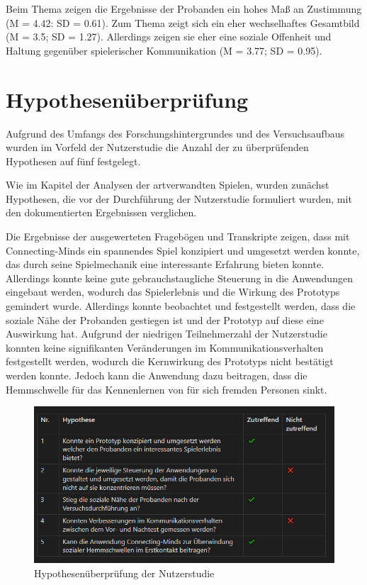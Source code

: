 Beim Thema  zeigen die Ergebnisse der Probanden ein hohes Maß an Zustimmung (M = 4.42: SD = 0.61). Zum Thema  zeigt sich ein eher wechselhaftes Gesamtbild (M = 3.5; SD = 1.27). Allerdings zeigen sie eher eine soziale Offenheit und Haltung gegenüber spielerischer Kommunikation (M = 3.77; SD = 0.95).

\section{Hypothesenüberprüfung}
Aufgrund des Umfangs des Forschungshintergrundes und des Versuchsaufbaus wurden im Vorfeld der Nutzerstudie die Anzahl der zu überprüfenden Hypothesen auf fünf festgelegt.

Wie im Kapitel der Analysen der artverwandten Spielen, wurden zunächst Hypothesen, die vor der Durchführung der Nutzerstudie formuliert wurden, mit den dokumentierten Ergebnissen verglichen. 

Die Ergebnisse der ausgewerteten Fragebögen und Transkripte zeigen, dass mit Connecting-Minds ein spannendes Spiel konzipiert und umgesetzt werden konnte, das durch seine Spielmechanik eine interessante Erfahrung bieten konnte. Allerdings konnte keine gute gebrauchstaugliche Steuerung in die Anwendungen eingebaut werden, wodurch das Spielerlebnis und die Wirkung des Prototyps gemindert wurde. Allerdings konnte beobachtet und festgestellt werden, dass die soziale Nähe der Probanden gestiegen ist und der Prototyp auf diese eine Auswirkung hat. Aufgrund der niedrigen Teilnehmerzahl der Nutzerstudie konnten keine signifikanten Veränderungen im Kommunikationsverhalten festgestellt werden, wodurch die Kernwirkung des Prototyps nicht bestätigt werden konnte. Jedoch kann die Anwendung dazu beitragen, dass die Hemmschwelle für das Kennenlernen von für sich fremden Personen sinkt.

\begin{figure}[ht]
\centering
\includegraphics[width=1\linewidth]{content/pictures/Hypothesen_Nutzerstudie.PNG}
\caption{Hypothesenüberprüfung der Nutzerstudie}
\label{fig:hypothesis_user_study}
\end{figure}

